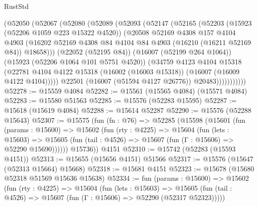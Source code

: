 \begin{lexlean}{RustStd}
\begin{coremodule}
              (@52050
                (@52067
                  (@52080
                    (@52089
                      (@52093
                        (@52147
                          (@52165
                            (@52203
                              (@15923 (@52206 @1059 @223 @15322 @4520))
                              (@20508
                                @52169
                                @4308
                                @157
                                @4104
                                @4903
                                (@16202
                                  @52169
                                  @4308
                                  @84
                                  @4104
                                  @84
                                  @4903
                                  (@16210 (@16211 @52169 @84))
                                  @18658)))
                            (@22052 (@52195 @84))
                            (@16007 (@52199 @264 @1064))
                            (@15923 (@52206 @1064 @101 @5751 @4520))
                            (@34759
                              @4123
                              @4104
                              @15318
                              (@22781
                                @4104
                                @4122
                                @15318
                                (@16002 (@16003 @15318))
                                (@16007 (@16009 @4122 @4104)))))
                          @22501
                          (@16007 (@51594 @4127 @26776))
                          @20483)))))))))))
@52278 := @15559 @4084
@52282 := @15561 (@15565 @4084) (@15571 @4084)
@52283 := @15580 @51563
@52285 := @15576 (@52283 @15595)
@52287 := @15618 (@15619 @4084)
@52288 := @15614 @52287
@52290 := @15576 (@52288 @15643)
@52307 := @15575
    (fun (fn : @76) =>
    @52285
      (@15598
        (@15601
          (fun (params : @15600) =>
          @15602
            (fun (rty : @4225) =>
            @15604
              (fun (lets : @15603) =>
              @15605 (fun (tail : @4526) => @15607 (fun (Γ : @15606) => @52290 @15690))))))
        @15736))
    @4151
@52310 := @15742 (@52283 (@15593 @4151))
@52313 := @15655 (@15656 @4151) @51566
@52317 := @15576 (@15647 (@52313 @15664) @15668)
@52318 := @15681 @4151
@52323 := @15678 (@15680 @52318 @51569 @15636 @15638)
@52334 := fun (params : @15600) =>
  @15602
    (fun (rty : @4225) =>
    @15604
      (fun (lets : @15603) =>
      @15605 (fun (tail : @4526) => @15607 (fun (Γ : @15606) => @52290 (@52317 @52323)))))

\end{coremodule}
\end{lexlean}

